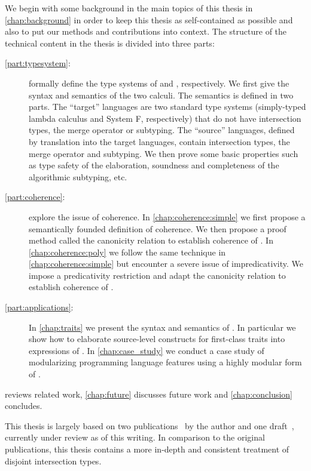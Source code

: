 We begin with some background in the main topics of this thesis in
\cref{chap:background} in order to keep this thesis as self-contained as
possible and also to put our methods and contributions into context. The
structure of the technical content in the thesis is divided into three parts:
\begin{description}
\item[\cref{part:typesystem}:]  formally define the type systems of
  \namee and \fnamee, respectively. We first give the syntax and semantics of
  the two calculi. The semantics is defined in two parts. The ``target''
  languages are two standard type systems (simply-typed lambda calculus and
  System F, respectively) that do not have intersection types, the merge
  operator or subtyping. The ``source'' languages, defined by translation into
  the target languages, contain intersection types, the merge operator and
  subtyping. We then prove some basic properties such as type safety of
  the elaboration, soundness and completeness of the algorithmic subtyping, etc.
\item[\cref{part:coherence}:]  explore the
  issue of coherence. In \cref{chap:coherence:simple} we first propose a
  semantically founded definition of coherence. We then propose a proof method
  called the canonicity relation to establish coherence of \namee. In
  \cref{chap:coherence:poly} we follow the same technique in
  \cref{chap:coherence:simple} but encounter a severe issue of impredicativity.
  We impose a predicativity restriction and adapt the canonicity relation to
  establish coherence of \fnamee.
\item[\cref{part:applications}:] In \cref{chap:traits} we present the syntax and semantics of
  \sedel. In particular we show how to elaborate source-level constructs for
  first-class traits into expressions of \fnamee. In \cref{chap:case_study} we
  conduct a case study of modularizing programming language features using a
  highly modular form of \visitor.
\end{description}
 reviews related work, \cref{chap:future} discusses future
work and \cref{chap:conclusion} concludes.

This thesis is largely based on two
publications~\citep{bi_et_al:LIPIcs:2018:9214, bi_et_al:LIPIcs:2018:9227} by the
author and one draft~\citep{xuanbiesop}, currently under review as of this writing.
In comparison to the original publications, this thesis contains a
more in-depth and consistent treatment of disjoint intersection types.

